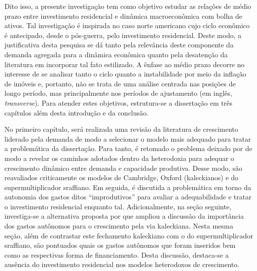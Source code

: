 Dito isso, a presente investigação tem como objetivo estudar as relações de médio prazo entre investimento residencial e dinâmica macroeconômica com bolha de ativos. 
Tal investigação é inspirada no caso norte americano cujo ciclo econômico é antecipado, desde o pós-guerra, pelo investimento residencial. Deste modo, a justificativa desta pesquisa se dá tanto pela relevância deste componente da demanda agregada para a dinâmica econômica quanto pela desatenção da literatura em incorporar tal fato estilizado. 
A ênfase ao médio prazo decorre no interesse de se analisar tanto o ciclo quanto a instabilidade por meio da inflação de imóveis e, portanto, não se trata de uma análise centrada nas posições de longo período, mas principalmente nos períodos de ajustamento (em inglês, \textit{transverse}).
Para atender estes objetivos, estrutura-se a dissertação em três capítulos além desta introdução e da conclusão.

No primeiro capítulo, será realizada uma revisão da literatura de crescimento liderado pela demanda de modo a selecionar o modelo mais adequado para tratar a problemática da dissertação. Para tanto, é retomado o problema deixado por \textcite{harrod_essay_1939} de modo a revelar os caminhos adotados dentro da heterodoxia para adequar o crescimento dinâmico entre demanda e capacidade produtiva. Desse modo, são reavaliados criticamente os modelos de Cambridge, Oxford (kaleckianos) e do supermultiplicador sraffiano. 
Em seguida, é discutida a problemática em torno da autonomia dos gastos ditos ``improdutivos'' para avaliar a adequabilidade e tratar o investimento residencial enquanto tal.
Adicionalmente, na seção seguinte, investiga-se a alternativa proposta por \textcite{allain_tackling_2015} que 
ampliou a discussão da importância dos gastos autônomos para o crescimento pela via kaleckiana. 
Nesta mesma seção, além de contrastar este fechamento kaleckiano com o do supermultiplicador sraffiano, são pontuados quais os gastos autônomos que foram inseridos bem como as respectivas forma de financiamento.
Desta discussão, destaca-se a ausência do investimento residencial nos modelos heterodoxos de crescimento. %




